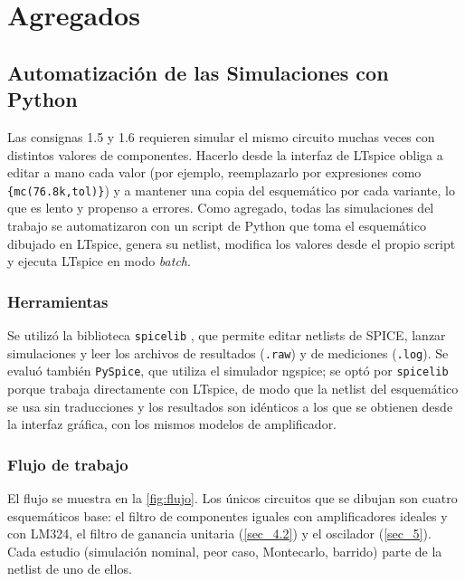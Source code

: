 \section{Agregados}
\label{sec_4}

\subsection{Automatización de las Simulaciones con Python}
\label{sec_4.1}
Las consignas 1.5 y 1.6 requieren simular el mismo circuito muchas veces con distintos valores de componentes. Hacerlo desde la interfaz de LTspice obliga a editar a mano cada valor (por ejemplo, reemplazarlo por expresiones como \texttt{\{mc(76.8k,tol)\}}) y a mantener una copia del esquemático por cada variante, lo que es lento y propenso a errores. Como agregado, todas las simulaciones del trabajo se automatizaron con un script de Python que toma el esquemático dibujado en LTspice, genera su netlist, modifica los valores desde el propio script y ejecuta LTspice en modo \textit{batch}.

\subsubsection{Herramientas}
Se utilizó la biblioteca \texttt{spicelib} \cite{spicelib}, que permite editar netlists de SPICE, lanzar simulaciones y leer los archivos de resultados (\texttt{.raw}) y de mediciones (\texttt{.log}). Se evaluó también \texttt{PySpice}, que utiliza el simulador ngspice; se optó por \texttt{spicelib} porque trabaja directamente con LTspice, de modo que la netlist del esquemático se usa sin traducciones y los resultados son idénticos a los que se obtienen desde la interfaz gráfica, con los mismos modelos de amplificador.

\subsubsection{Flujo de trabajo}
El flujo se muestra en la \autoref{fig:flujo}. Los únicos circuitos que se dibujan son cuatro esquemáticos base: el filtro de componentes iguales con amplificadores ideales y con LM324, el filtro de ganancia unitaria (\autoref{sec_4.2}) y el oscilador (\autoref{sec_5}). Cada estudio (simulación nominal, peor caso, Montecarlo, barrido) parte de la netlist de uno de ellos.


